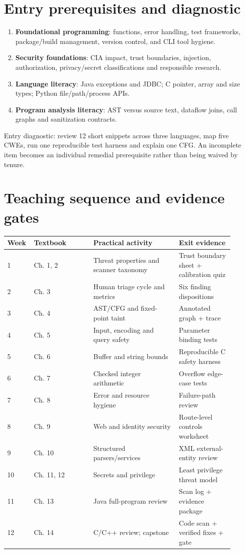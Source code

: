 \documentclass[10pt,letterpaper]{article}
\begin{document}
\section{Entry prerequisites and diagnostic}
\begin{enumerate}
\item \textbf{Foundational programming}: functions, error handling, test frameworks, package/build management, version control, and CLI tool hygiene.
\item \textbf{Security foundations}: CIA impact, trust boundaries, injection, authorization, privacy/secret classifications and responsible research.
\item \textbf{Language literacy}: Java exceptions and JDBC; C pointer, array and size types; Python file/path/process APIs.
\item \textbf{Program analysis literacy}: AST versus source text, dataflow joins, call graphs and sanitization contracts.
\end{enumerate}
Entry diagnostic: review 12 short snippets across three languages, map five CWEs, run one reproducible test harness and explain one CFG. An incomplete item becomes an individual remedial prerequisite rather than being waived by tenure.
\section{Teaching sequence and evidence gates}
\small
\begin{longtable}{@{}p{0.08\linewidth}p{0.25\linewidth}>{\raggedright\arraybackslash}p{0.36\linewidth}>{\raggedright\arraybackslash}p{0.23\linewidth}@{}}\toprule
Week & Textbook & Practical activity & Exit evidence\\\midrule\endhead
1 & Ch. 1, 2 & Threat properties and scanner taxonomy & Trust boundary sheet + calibration quiz\\
2 & Ch. 3 & Human triage cycle and metrics & Six finding dispositions\\
3 & Ch. 4 & AST/CFG and fixed-point taint & Annotated graph + trace\\
4 & Ch. 5 & Input, encoding and query safety & Parameter binding tests\\
5 & Ch. 6 & Buffer and string bounds & Reproducible C safety harness\\
6 & Ch. 7 & Checked integer arithmetic & Overflow edge-case tests\\
7 & Ch. 8 & Error and resource hygiene & Failure-path review\\
8 & Ch. 9 & Web and identity security & Route-level controls worksheet\\
9 & Ch. 10 & Structured parsers/services & XML external-entity review\\
10 & Ch. 11, 12 & Secrets and privilege & Least privilege threat model\\
11 & Ch. 13 & Java full-program review & Scan log + evidence package\\
12 & Ch. 14 & C/C++ review; capstone & Code scan + verified fixes + gate\\\bottomrule
\end{longtable}\normalsize
\end{document}
